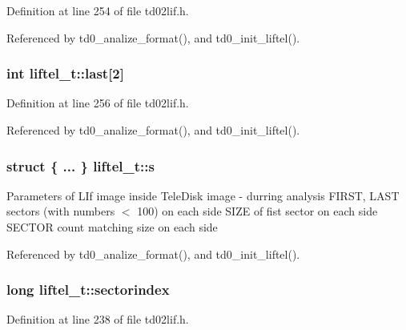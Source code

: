 Definition at line 254 of file td02lif.\+h.



Referenced by td0\+\_\+analize\+\_\+format(), and td0\+\_\+init\+\_\+liftel().

\subsubsection[{\texorpdfstring{last}{last}}]{\setlength{\rightskip}{0pt plus 5cm}int liftel\+\_\+t\+::last\mbox{[}2\mbox{]}}\hypertarget{structliftel__t_accda68319750f6ea7a63948fb0d7d223}{}\label{structliftel__t_accda68319750f6ea7a63948fb0d7d223}


Definition at line 256 of file td02lif.\+h.



Referenced by td0\+\_\+analize\+\_\+format(), and td0\+\_\+init\+\_\+liftel().

\subsubsection[{\texorpdfstring{s}{s}}]{\setlength{\rightskip}{0pt plus 5cm}struct \{ ... \}   liftel\+\_\+t\+::s}\hypertarget{structliftel__t_a73a275fa51f9aa617d3975ac29d1befa}{}\label{structliftel__t_a73a275fa51f9aa617d3975ac29d1befa}
Parameters of L\+If image inside Tele\+Disk image -\/ durring analysis F\+I\+R\+ST, L\+A\+ST sectors (with numbers $<$ 100) on each side S\+I\+ZE of fist sector on each side S\+E\+C\+T\+OR count matching size on each side 

Referenced by td0\+\_\+analize\+\_\+format(), and td0\+\_\+init\+\_\+liftel().

\subsubsection[{\texorpdfstring{sectorindex}{sectorindex}}]{\setlength{\rightskip}{0pt plus 5cm}long liftel\+\_\+t\+::sectorindex}\hypertarget{structliftel__t_a13e9f8b2e23d8f028f456d4465beb4d5}{}\label{structliftel__t_a13e9f8b2e23d8f028f456d4465beb4d5}


Definition at line 238 of file td02lif.\+h.



